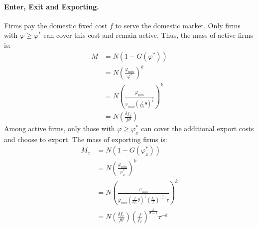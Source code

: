 \begin{solution}
	\paragraph{Enter, Exit and Exporting.} Firms pay the domestic fixed cost $f$ to serve the domestic market. Only firms with $\varphi \geq \varphi^*$ can cover this cost and remain active. Thus, the mass of active firms is:
	\begin{align*}
		M &= N \left( 1 - G(\varphi^*) \right)\\
		&= N \left( \frac{\varphi_{\min}}{\varphi^*} \right)^k \\
		&= N \left( \frac{\varphi_{\min}}{\varphi_{min}\left( \frac{f}{\delta f_e}\theta \right)^{\frac{1}{k}}} \right)^k \\
		&= N \left( \frac{\delta f_e}{f \theta} \right)
	\end{align*}
	Among active firms, only those with $\varphi \geq \varphi_x^*$ can cover the additional export costs and choose to export. The mass of exporting firms is:
	\begin{align*}
		M_x &= N \left( 1 - G(\varphi_x^*) \right)\\
		&= N \left( \frac{\varphi_{\min}}{\varphi_x^*} \right)^k \\
		&= N \left( \frac{\varphi_{\min}}{\varphi_{min}\left( \frac{f}{\delta f_e}\theta \right)^{\frac{1}{k}} \left( \frac{f_x}{f} \right)^{\frac{1}{\sigma - 1}} \tau} \right)^k \\
		&= N \left( \frac{\delta f_e}{f \theta} \right) \left( \frac{f}{f_x} \right)^{\frac{k}{\sigma - 1}} \tau^{-k}
	\end{align*}


\end{solution}
